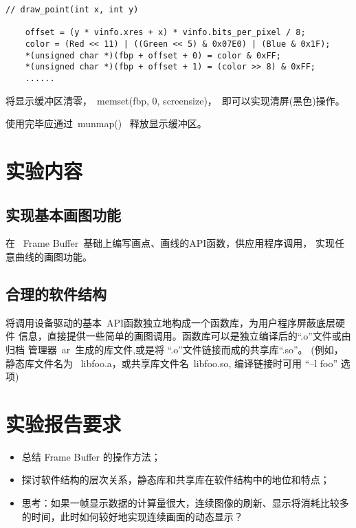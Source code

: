 \begin{boxedminipage}{.9\textwidth}
\begin{verbatim}
// draw_point(int x, int y)

    offset = (y * vinfo.xres + x) * vinfo.bits_per_pixel / 8;
    color = (Red << 11) | ((Green << 5) & 0x07E0) | (Blue & 0x1F);
    *(unsigned char *)(fbp + offset + 0) = color & 0xFF;
    *(unsigned char *)(fbp + offset + 1) = (color >> 8) & 0xFF;
    ......
\end{verbatim}
\end{boxedminipage}

	将显示缓冲区清零，~memset(fbp, 0, screensize)，~即可以实现清屏(黑色)操作。

使用完毕应通过~munmap()~ 释放显示缓冲区。
\section{实验内容}
\subsection{实现基本画图功能}
	在 ~Frame Buffer~基础上编写画点、画线的API函数，供应用程序调用，
实现任意曲线的画图功能。

\subsection{合理的软件结构}
    将调用设备驱动的基本~API函数独立地构成一个函数库，为用户程序屏蔽底层硬件
信息，直接提供一些简单的画图调用。函数库可以是独立编译后的``.o''文件或由归档
管理器~ar~生成的库文件,或是将 ``.o''文件链接而成的共享库``.so''。
(例如，静态库文件名为 ~libfoo.a，或共享库文件名~libfoo.so, 编译链接时可用
``--l foo'' 选项)

\section{实验报告要求}
\begin{itemize}
  \item 总结 Frame Buffer 的操作方法；
  \item 探讨软件结构的层次关系，静态库和共享库在软件结构中的地位和特点；
  \item 思考：如果一帧显示数据的计算量很大，连续图像的刷新、显示将消耗比较多
		的时间，此时如何较好地实现连续画面的动态显示？
\end{itemize}
